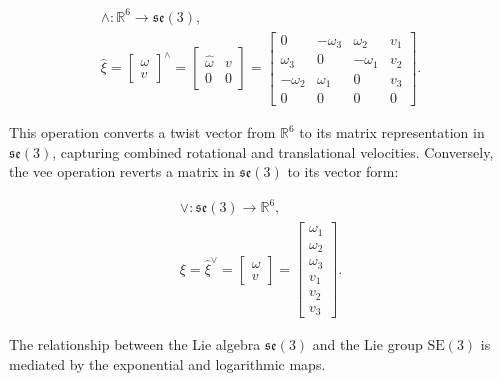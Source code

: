 \begin{equation}
    \begin{aligned}
        \wedge : \mathbb{R}^6 \rightarrow \mathfrak{se}(3), \\
        \hat{\xi} = \begin{bmatrix} \omega \\ v \end{bmatrix}^\wedge = \begin{bmatrix} \hat{\omega} & v \\ 0 & 0 \end{bmatrix} = \begin{bmatrix} 0 & -\omega_3 & \omega_2 & v_1 \\ \omega_3 & 0 & -\omega_1 & v_2 \\ -\omega_2 & \omega_1 & 0 & v_3 \\ 0 & 0 & 0 & 0 \end{bmatrix}.
    \end{aligned}
    \label{eq:hat_SE3}
\end{equation}

This operation converts a twist vector from \(\mathbb{R}^6\) to its matrix representation in \(\mathfrak{se}(3)\), capturing combined rotational and translational velocities. Conversely, the vee operation reverts a matrix in \(\mathfrak{se}(3)\) to its vector form:

\begin{equation}
    \begin{aligned}
        \vee : \mathfrak{se}(3) \rightarrow \mathbb{R}^6, \\
        \xi = \hat{\xi}^\vee = \begin{bmatrix} \omega \\ v \end{bmatrix} = \begin{bmatrix} \omega_1 \\ \omega_2 \\ \omega_3 \\ v_1 \\ v_2 \\ v_3 \end{bmatrix}.
    \end{aligned}
    \label{eq:vee_SE3}
\end{equation}


The relationship between the Lie algebra \(\mathfrak{se}(3)\) and the Lie group \(\mathrm{SE}(3)\) is mediated by the exponential and logarithmic maps.

